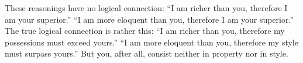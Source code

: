 These reasonings have no logical connection: ``I am richer than you,
therefore I am your superior.'' ``I am more eloquent than you, therefore I
am your superior.'' The true logical connection is rather this: ``I am
richer than you, therefore my possessions must exceed yours.'' ``I am more
eloquent than you, therefore my style must surpass yours.'' But you, after
all, consist neither in property nor in style.
